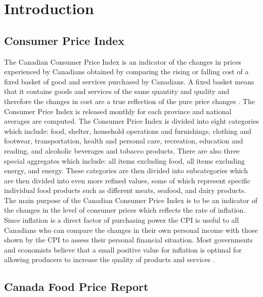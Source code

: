 \documentclass[12pt]{dalthesis}
\begin{document}
\mainmatter

\chapter{Introduction}

\section{Consumer Price Index}

The Canadian Consumer Price Index is an indicator of the changes in prices experienced by Canadians obtained by comparing the rising or falling cost of a fixed basket of good and services purchased by Canadians. A fixed basket means that it contains goods and services of the same quantity and quality and therefore the changes in cost are a true reflection of the pure price changes \cite{statscan}.  The Consumer Price Index is released monthly for each province and national averages are computed. The Consumer Price Index is divided into eight categories which include: food, shelter, household operations and furnishings, clothing and footwear, transportation, health and personal care, recreation, education and reading, and alcoholic beverages and tobacco products. There are also three special aggregates which include: all items excluding food, all items excluding energy, and energy. These categories are then divided into subcategories which are then divided into even more refined values, some of which represent specific individual food products such as different meats, seafood, and dairy products. \\

The main purpose of the Canadian Consumer Price Index is to be an indicator of the changes in the level of consumer prices which reflects the rate of inflation. Since inflation is a direct factor of purchasing power the CPI is useful to all Canadians who can compare the changes in their own personal income with those shown by the CPI to assess their personal financial situation. Most governments and economists believe that a small positive value for inflation is optimal for allowing producers to increase the quality of products and services \cite{jay}. 

\section{Canada Food Price Report}
\end{document}
